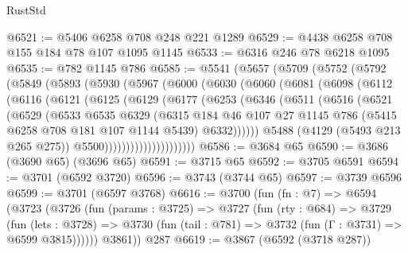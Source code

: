 \begin{lexlean}{RustStd}
\begin{coremodule}
@6521 := @5406 @6258 @708 @248 @221 @1289
@6529 := @4438 @6258 @708 @155 @184 @78 @107 @1095 @1145
@6533 := @6316 @246 @78 @6218 @1095
@6535 := @782 @1145 @786
@6585 := @5541
    (@5657
      (@5709
        (@5752
          (@5792
            (@5849
              (@5893
                (@5930
                  (@5967
                    (@6000
                      (@6030
                        (@6060
                          (@6081
                            (@6098
                              (@6112
                                (@6116
                                  (@6121
                                    (@6125
                                      (@6129
                                        (@6177
                                          (@6253
                                            (@6346
                                              (@6511
                                                (@6516
                                                  (@6521
                                                    (@6529
                                                      (@6533
                                                        @6535
                                                        @6329
                                                        (@6315
                                                          @184
                                                          @46
                                                          @107
                                                          @27
                                                          @1145
                                                          @786
                                                          (@5415 @6258 @708 @181 @107 @1144 @5439)
                                                          @6332))))))
                                              @5488
                                              (@4129 (@5493 @213 @265 @275))
                                              @5500)))))))))))))))))))))
@6586 := @3684 @65
@6590 := @3686 (@3690 @65) (@3696 @65)
@6591 := @3715 @65
@6592 := @3705 @6591
@6594 := @3701 (@6592 @3720)
@6596 := @3743 (@3744 @65)
@6597 := @3739 @6596
@6599 := @3701 (@6597 @3768)
@6616 := @3700
    (fun (fn : @7) =>
    @6594
      (@3723
        (@3726
          (fun (params : @3725) =>
          @3727
            (fun (rty : @684) =>
            @3729
              (fun (lets : @3728) =>
              @3730 (fun (tail : @781) => @3732 (fun (Γ : @3731) => @6599 @3815))))))
        @3861))
    @287
@6619 := @3867 (@6592 (@3718 @287))

\end{coremodule}
\end{lexlean}
